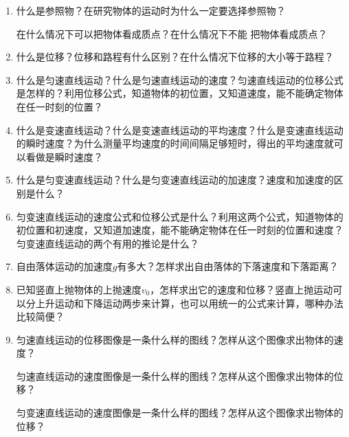 \begin{enumerate}
\item 什么是参照物？在研究物体的运动时为什么一定要选择参照物？

在什么情况下可以把物体看成质点？在什么情况下不能
把物体看成质点？
\item 什么是位移？位移和路程有什么区别？在什么情况下位移的大小等于路程？
\item 什么是匀速直线运动？什么是匀速直线运动的速度？匀速直线运动的位移公式是怎样的？利用位移公式，知道物体的初位置，又知道速度，能不能确定物体在任一时刻的位置？
\item 什么是变速直线运动？什么是变速直线运动的平均速度？什么是变速直线运动的瞬时速度？为什么测量平均速度的时间间隔足够短时，得出的平均速度就可以看做是瞬时速度？
\item 什么是匀变速直线运动？什么是匀变速直线运动的加速度？速度和加速度的区别是什么？
\item 匀变速直线运动的速度公式和位移公式是什么？利用这两个公式，知道物体的初位置和初速度，又知道加速度，能不能确定物体在任一时刻的位置和速度？
匀变速直线运动的两个有用的推论是什么？
\item 自由落体运动的加速度$g$有多大？怎样求出自由落体的下落速度和下落距离？
\item 已知竖直上抛物体的上抛速度$v_0$，怎样求出它的速度和位移？竖直上抛运动可以分上升运动和下降运动两步来计算，也可以用统一的公式来计算，哪种办法比较简便？
\item 匀速直线运动的位移图像是一条什么样的图线？怎样从这个图像求出物体的速度？

匀速直线运动的速度图像是一条什么样的图线？怎样从这个图像求出物体的位移？

匀变速直线运动的速度图像是一条什么样的图线？怎样从这个图像求出物体的位移？

\end{enumerate}



